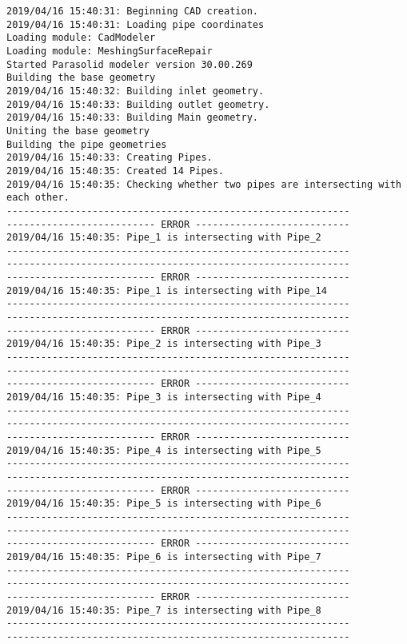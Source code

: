 \documentclass{article}
\begin{document}
{\tiny 
\begin{verbatim}
2019/04/16 15:40:31: Beginning CAD creation.
2019/04/16 15:40:31: Loading pipe coordinates
Loading module: CadModeler
Loading module: MeshingSurfaceRepair
Started Parasolid modeler version 30.00.269
Building the base geometry
2019/04/16 15:40:32: Building inlet geometry.
2019/04/16 15:40:33: Building outlet geometry.
2019/04/16 15:40:33: Building Main geometry.
Uniting the base geometry
Building the pipe geometries
2019/04/16 15:40:33: Creating Pipes.
2019/04/16 15:40:35: Created 14 Pipes.
2019/04/16 15:40:35: Checking whether two pipes are intersecting with each other.
------------------------------------------------------------
-------------------------- ERROR ---------------------------
2019/04/16 15:40:35: Pipe_1 is intersecting with Pipe_2
------------------------------------------------------------
------------------------------------------------------------
-------------------------- ERROR ---------------------------
2019/04/16 15:40:35: Pipe_1 is intersecting with Pipe_14
------------------------------------------------------------
------------------------------------------------------------
-------------------------- ERROR ---------------------------
2019/04/16 15:40:35: Pipe_2 is intersecting with Pipe_3
------------------------------------------------------------
------------------------------------------------------------
-------------------------- ERROR ---------------------------
2019/04/16 15:40:35: Pipe_3 is intersecting with Pipe_4
------------------------------------------------------------
------------------------------------------------------------
-------------------------- ERROR ---------------------------
2019/04/16 15:40:35: Pipe_4 is intersecting with Pipe_5
------------------------------------------------------------
------------------------------------------------------------
-------------------------- ERROR ---------------------------
2019/04/16 15:40:35: Pipe_5 is intersecting with Pipe_6
------------------------------------------------------------
------------------------------------------------------------
-------------------------- ERROR ---------------------------
2019/04/16 15:40:35: Pipe_6 is intersecting with Pipe_7
------------------------------------------------------------
------------------------------------------------------------
-------------------------- ERROR ---------------------------
2019/04/16 15:40:35: Pipe_7 is intersecting with Pipe_8
------------------------------------------------------------
------------------------------------------------------------

\end{verbatim}}
\end{document}
